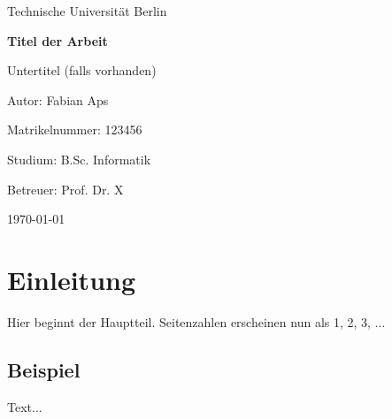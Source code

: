 \documentclass[12pt,a4paper]{report} %
\begin{document}
\begin{titlepage}
  \centering
  {\Large Technische Universität Berlin\par}
  \vspace{2cm}
  {\Huge\bfseries Titel der Arbeit\par}
  \vspace{1.5cm}
  {\Large Untertitel (falls vorhanden)\par}
  \vfill
  {\large Autor: Fabian Aps\par}
  {\large Matrikelnummer: 123456\par}
  {\large Studium: B.Sc. Informatik\par}
  \vspace{1cm}
  {\large Betreuer: Prof. Dr. X\par}
  \vspace{2cm}
  {\large \today\par}
  \thispagestyle{empty} %
\end{titlepage}

\cleardoublepage
{} %
\setcounter{page}{1}  %

\tableofcontents
\clearpage

\cleardoublepage
{}
\setcounter{page}{2}

\chapter{Einleitung}
Hier beginnt der Hauptteil. Seitenzahlen erscheinen nun als 1, 2, 3, ...

\section{Beispiel}
Text...
\end{document}
